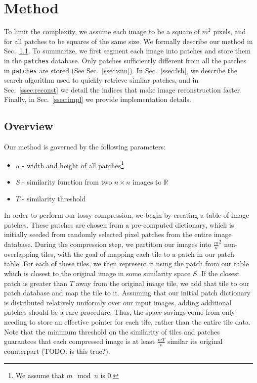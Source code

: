 \section{Method}\label{sec:method}

To limit the complexity, we assume
each image to be a square of $m^2$ pixels, and for all patches to
be squares of the same size.
We formally describe our method in Sec.~\ref{ssec:overview}. To summarize,
we first segment each image into patches and store them in the \texttt{patches} database.
Only patches sufficiently different
from all the patches in \texttt{patches} are stored (See Sec.~\ref{ssec:sim}).
In 
Sec.~\ref{ssec:lsh}, we describe the
search algorithm used to quickly retrieve similar patches, and in Sec.~\ref{ssec:reconst}
we detail the indices that make image reconstruction faster. Finally, in
Sec.~\ref{ssec:impl} we provide implementation details.

\subsection{Overview}\label{ssec:overview}

Our method is governed by the following parameters:
\begin{itemize}
\item $n$ - width and height of all patches\footnote{We assume that $m \mod n$ is $0$.}
\item $S$ - similarity function from two $n \times n$ images to $\mathbb{R}$
\item $T$ - similarity threshold
\end{itemize}

In order to perform our lossy compression, we begin by creating a table of image patches.  These patches are chosen from a pre-computed dictionary, which is initially seeded from randomly selected pixel patches from the entire image database.   During the compression step, we partition our images into $\frac{m}{n}^2$ non-overlapping tiles, with the goal of mapping each tile to a patch in our patch table.  For each of these tiles, we then represent it using the patch from our table which is closest to the original image in some similarity space $S$.  If the closest patch is greater than $T$ away from the original image tile, we add that tile to our patch database and map the tile to it.  Assuming that our initial patch dictionary is distributed relatively uniformly over our input images, adding additional patches should be a rare procedure.  Thus, the space savings come from only needing to store an effective pointer for each tile, rather than the entire tile data.  Note that the minimum threshold on the similarity of tiles and patches guarantees that each compressed image is at least $\frac{mT}{n}$ similar its original counterpart (TODO: is this true?).

